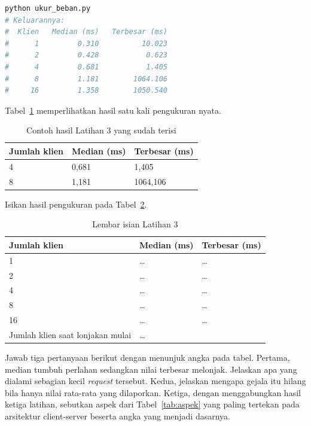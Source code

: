 \begin{lstlisting}[language=bash, caption={Menambah jumlah klien serentak, skrip
  tersedia di \berkas{sources/chapter01/ukur_beban.py}},
  label=lst:jalankan-beban]
python ukur_beban.py
# Keluarannya:
#  Klien   Median (ms)   Terbesar (ms)
#      1         0.310          10.023
#      2         0.428           0.623
#      4         0.681           1.405
#      8         1.181        1064.106
#     16         1.358        1050.540
\end{lstlisting}

Tabel~\ref{tab:lat3cs-contoh} memperlihatkan hasil satu kali pengukuran nyata.

\begin{table}[htbp]
  \centering
  \caption{Contoh hasil Latihan 3 yang sudah terisi}
  \label{tab:lat3cs-contoh}
  \begin{tabularx}{\textwidth}{|X|l|l|}
    \hline
    \textbf{Jumlah klien} & \textbf{Median (ms)} & \textbf{Terbesar (ms)} \\
    \hline
    4 & 0,681 & 1,405 \\
    \hline
    8 & 1,181 & 1064,106 \\
    \hline
  \end{tabularx}
\end{table}

Isikan hasil pengukuran pada Tabel~\ref{tab:lat3cs-hasil}.

\begin{table}[htbp]
  \centering
  \caption{Lembar isian Latihan 3}
  \label{tab:lat3cs-hasil}
  \begin{tabularx}{\textwidth}{|X|l|l|}
    \hline
    \textbf{Jumlah klien} & \textbf{Median (ms)} & \textbf{Terbesar (ms)} \\
    \hline
    1 & \dots & \dots \\
    \hline
    2 & \dots & \dots \\
    \hline
    4 & \dots & \dots \\
    \hline
    8 & \dots & \dots \\
    \hline
    16 & \dots & \dots \\
    \hline
    Jumlah klien saat lonjakan mulai & \multicolumn{2}{l|}{\dots} \\
    \hline
  \end{tabularx}
\end{table}

Jawab tiga pertanyaan berikut dengan menunjuk angka pada tabel. Pertama, median
tumbuh perlahan sedangkan nilai terbesar melonjak. Jelaskan apa yang dialami
sebagian kecil \textit{request} tersebut. Kedua, jelaskan mengapa gejala itu
hilang bila hanya nilai rata-rata yang dilaporkan. Ketiga, dengan menggabungkan
hasil ketiga latihan, sebutkan aspek dari Tabel~\ref{tab:aspek} yang paling
tertekan pada arsitektur client-server beserta angka yang menjadi dasarnya.
